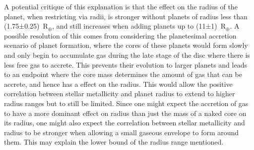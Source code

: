 \documentclass[a4paper,twocolumn,12pt]{article}
\begin{document}
A potential critique of this explanation is that the effect on the radius of the planet, when restricting via radii, is stronger without planets of radius less than (1.75±0.25)~R$_\oplus$, and still increases when adding planets up to (11±1)~R$_\oplus$. A possible resolution of this comes from considering the planetesimal accretion scenario of planet formation, where the cores of these planets would form slowly and only begin to accumulate gas during the late stage of the disc where there is less free gas to accrete. This prevents their evolution to larger planets and leads to an endpoint where the core mass determines the amount of gas that can be accrete, and hence has a effect on the radius. This would allow the positive correlation between stellar metallicity and planet radius to extend to higher radius ranges but to still be limited. Since one might expect the accretion of gas to have a more dominant effect on radius than just the mass of a naked core on its radius, one might also expect the correlation between stellar metallicity and radius to be stronger when allowing a small gaseous envelope to form around them. This may explain the lower bound of the radius range mentioned.




\end{document}
